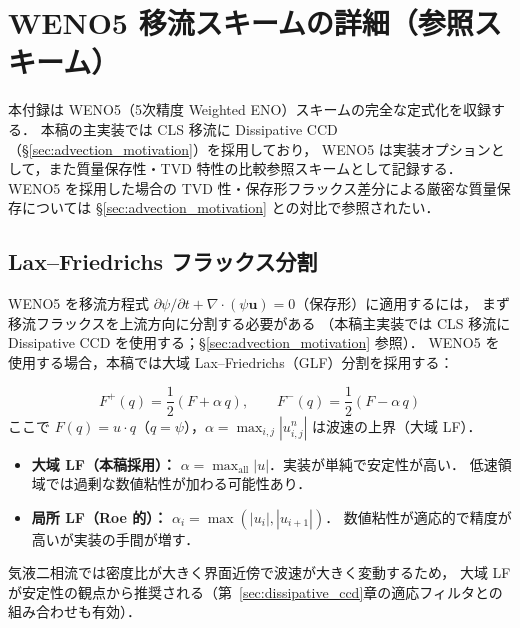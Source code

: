 \section{WENO5 移流スキームの詳細（参照スキーム）}
\label{app:weno5}

本付録は WENO5（5次精度 Weighted ENO）スキームの完全な定式化を収録する．
本稿の主実装では CLS 移流に Dissipative CCD（§\ref{sec:advection_motivation}）を採用しており，
WENO5 は実装オプションとして，また質量保存性・TVD 特性の比較参照スキームとして記録する．
WENO5 を採用した場合の TVD 性・保存形フラックス差分による厳密な質量保存については
§\ref{sec:advection_motivation} との対比で参照されたい．

\subsection{Lax--Friedrichs フラックス分割}
\label{app:lf_splitting}

WENO5 を移流方程式
$\partial\psi/\partial t + \nabla\cdot(\psi\bm{u}) = 0$（保存形）に適用するには，
まず移流フラックスを上流方向に分割する必要がある
（本稿主実装では CLS 移流に Dissipative CCD を使用する；§\ref{sec:advection_motivation} 参照）．
WENO5 を使用する場合，本稿では大域 Lax--Friedrichs（GLF）分割を採用する：

\begin{equation}
  F^+(q) = \frac{1}{2}(F + \alpha\, q), \qquad
  F^-(q) = \frac{1}{2}(F - \alpha\, q)
  \label{eq:lf_split}
\end{equation}
ここで $F(q) = u \cdot q$（$q = \psi$），$\alpha = \max_{i,j}|u_{i,j}^n|$ は波速の上界（大域 LF）．

\begin{tcolorbox}[warnbox, title={大域 LF vs 局所 LF}]
\begin{itemize}
  \item \textbf{大域 LF（本稿採用）：} $\alpha = \max_{\mathrm{all}}|u|$．実装が単純で安定性が高い．
        低速領域では過剰な数値粘性が加わる可能性あり．
  \item \textbf{局所 LF（Roe 的）：} $\alpha_i = \max(|u_i|, |u_{i+1}|)$．
        数値粘性が適応的で精度が高いが実装の手間が増す．
\end{itemize}
気液二相流では密度比が大きく界面近傍で波速が大きく変動するため，
大域 LF が安定性の観点から推奨される（第~\ref{sec:dissipative_ccd}章の適応フィルタとの組み合わせも有効）．
\end{tcolorbox}

